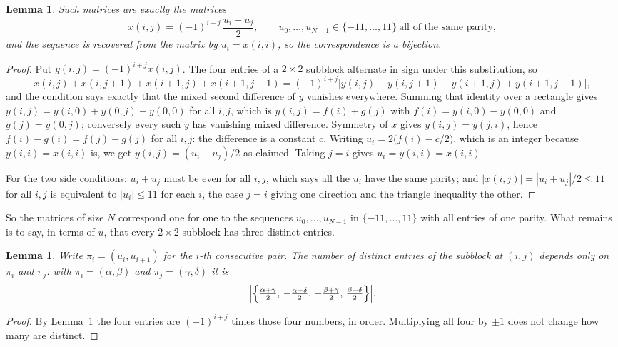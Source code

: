 \documentclass[11pt,a4paper]{article}
\theoremstyle{plain}
\newtheorem{lemma}[theorem]{Lemma}
\theoremstyle{definition}
\begin{document}
\begin{lemma}\label{lem:solve}
Such matrices are exactly the matrices
\[
x(i,j)=(-1)^{i+j}\,\frac{u_i+u_j}{2},
\qquad u_0,\dots,u_{N-1}\in\{-11,\dots,11\}\ \text{all of the same parity},
\]
and the sequence is recovered from the matrix by $u_i=x(i,i)$, so the correspondence is a
bijection.
\end{lemma}

\begin{proof}
Put $y(i,j)=(-1)^{i+j}x(i,j)$. The four entries of a $2\times2$ subblock alternate in sign
under this substitution, so
\[
x(i,j)+x(i,j{+}1)+x(i{+}1,j)+x(i{+}1,j{+}1)
=(-1)^{i+j}\bigl[y(i,j)-y(i,j{+}1)-y(i{+}1,j)+y(i{+}1,j{+}1)\bigr],
\]
and the condition says exactly that the mixed second difference of $y$ vanishes everywhere.
Summing that identity over a rectangle gives
$y(i,j)=y(i,0)+y(0,j)-y(0,0)$ for all $i,j$, which is $y(i,j)=f(i)+g(j)$ with
$f(i)=y(i,0)-y(0,0)$ and $g(j)=y(0,j)$; conversely every such $y$ has vanishing mixed
difference. Symmetry of $x$ gives $y(i,j)=y(j,i)$, hence $f(i)-g(i)=f(j)-g(j)$ for all $i,j$:
the difference is a constant $c$. Writing $u_i=2\bigl(f(i)-c/2\bigr)$, which is an integer
because $y(i,i)=x(i,i)$ is, we get $y(i,j)=(u_i+u_j)/2$ as claimed. Taking $j=i$ gives
$u_i=y(i,i)=x(i,i)$.

For the two side conditions: $u_i+u_j$ must be even for all $i,j$, which says all the $u_i$ have
the same parity; and $|x(i,j)|=|u_i+u_j|/2\le11$ for all $i,j$ is equivalent to $|u_i|\le11$
for each $i$, the case $j=i$ giving one direction and the triangle inequality the other.
\end{proof}

So the matrices of size $N$ correspond one for one to the sequences $u_0,\dots,u_{N-1}$ in
$\{-11,\dots,11\}$ with all entries of one parity. What remains is to say, in terms of $u$,
that every $2\times2$ subblock has three distinct entries.

\begin{lemma}\label{lem:block}
Write $\pi_i=(u_i,u_{i+1})$ for the $i$-th consecutive pair. The number of distinct entries of
the subblock at $(i,j)$ depends only on $\pi_i$ and $\pi_j$: with $\pi_i=(\alpha,\beta)$ and
$\pi_j=(\gamma,\delta)$ it is
\[
\Bigl|\Bigl\{\tfrac{\alpha+\gamma}{2},\,-\tfrac{\alpha+\delta}{2},\,
-\tfrac{\beta+\gamma}{2},\,\tfrac{\beta+\delta}{2}\Bigr\}\Bigr| .
\]
\end{lemma}

\begin{proof}
By Lemma~\ref{lem:solve} the four entries are $(-1)^{i+j}$ times those four numbers, in
order. Multiplying all four by $\pm1$ does not change how many are distinct.
\end{proof}
\end{document}
